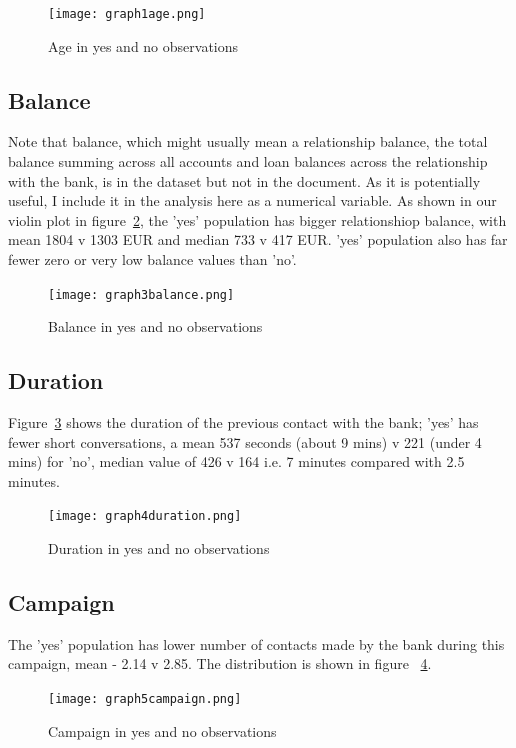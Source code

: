 \documentclass[9pt,technote]{IEEEtran}
\begin{document}
\begin{figure}[htbp]
\centerline{\texttt{[image: graph1age.png]}}
\caption{Age in yes and no observations}
\label{fig:graph1age}
\end{figure}

\subsection{Balance}

Note that balance, which might usually mean a relationship balance, the total balance summing across all accounts and loan balances across the relationship with the bank, is in the dataset but not in the document.  As it is potentially useful, I include it in the analysis here as a numerical variable.  As shown in our violin plot in figure~\ref{fig:graph3balance}, the 'yes' population has bigger relationshiop balance, with mean 1804 v 1303 EUR and median 733 v 417 EUR. 'yes' population also has far fewer zero or very low balance values than 'no'.  

\begin{figure}[htbp]
\centerline{\texttt{[image: graph3balance.png]}}
\caption{Balance in yes and no observations}
\label{fig:graph3balance}
\end{figure}

\subsection{Duration}

Figure~\ref{fig:graph4duration} shows the duration of the previous contact with the bank; 'yes' has fewer short conversations, a mean 537 seconds (about 9 mins) v 221 (under 4 mins) for 'no', median value of 426 v 164 i.e. 7 minutes compared with 2.5 minutes.  

\begin{figure}[htbp]
\centerline{\texttt{[image: graph4duration.png]}}
\caption{Duration in yes and no observations}
\label{fig:graph4duration}
\end{figure}

\subsection{Campaign}

The 'yes' population has lower number of contacts made by the bank during this campaign, mean - 2.14 v 2.85.  The distribution is shown in figure ~\ref{fig:graph5campaign}.

\begin{figure}[htbp]
\centerline{\texttt{[image: graph5campaign.png]}}
\caption{Campaign in yes and no observations}
\label{fig:graph5campaign}
\end{figure}
\end{document}
